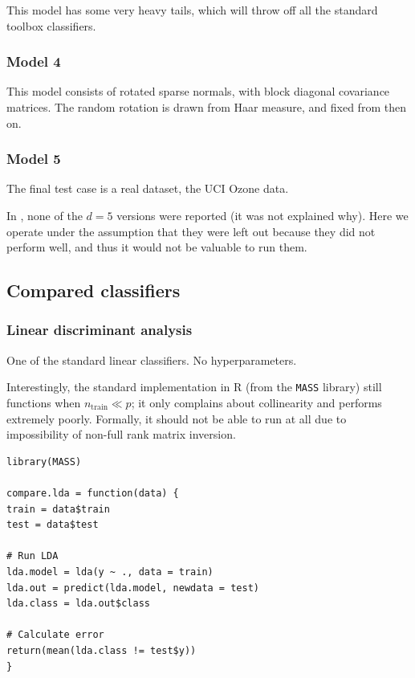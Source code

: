 \documentclass{amsart}
\begin{document}
This model has some very heavy tails, which will throw off all the standard
toolbox classifiers.

\subsubsection{Model 4}

This model consists of rotated sparse normals, with block diagonal covariance matrices. The random rotation is drawn from Haar measure, and fixed from then on.

\subsubsection{Model 5}

The final test case is a real dataset, the UCI Ozone data.

In \cite{CS15}, none of the $d=5$ versions were reported (it was not explained why).
Here we operate under the assumption that they were left out because
they did not perform well, and thus it would not be valuable to run them.






\subsection{Compared classifiers}


\subsubsection{Linear discriminant analysis}

One of the standard linear classifiers. No hyperparameters.

Interestingly, the standard implementation in R (from the \texttt{MASS}
library) still functions when $n_{\mathrm{train}}\ll p$; it only
complains about collinearity and performs extremely poorly. Formally, it
should not be able to run at all due to impossibility of non-full rank matrix inversion.

\begin{lstlisting}[caption=Modular LDA testing code]
library(MASS)

compare.lda = function(data) {
train = data$train
test = data$test

# Run LDA
lda.model = lda(y ~ ., data = train)
lda.out = predict(lda.model, newdata = test)
lda.class = lda.out$class

# Calculate error
return(mean(lda.class != test$y))
}
\end{lstlisting}
\end{document}
